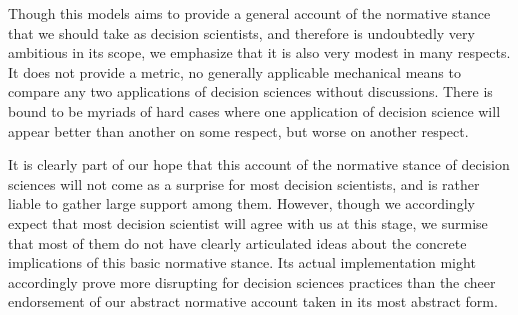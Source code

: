 \documentclass[preprint, french, english, 11pt, authoryear]{elsarticle}%
\newcommand{\commentOC}[1]{\textcolor{red}{OC: #1}}
\begin{document}
Though this models aims to provide a general account of the normative stance that we should take as decision scientists, and therefore is undoubtedly very ambitious in its scope, we emphasize that it is also very modest in many respects. It does not provide a metric, no generally applicable mechanical means to compare any two applications of decision sciences without discussions. There is bound to be myriads of hard cases where one application of decision science will appear better than another on some respect, but worse on another respect.

It is clearly part of our hope that this account of the normative stance of decision sciences will not come as a surprise for most decision scientists, and is rather liable to gather large support among them. However, though we accordingly expect that most decision scientist will agree with us at this stage, we surmise that most of them do not have clearly articulated ideas about the concrete implications of this basic normative stance. Its actual implementation might accordingly prove more disrupting for decision sciences practices than the cheer endorsement of our abstract normative account taken in its most abstract form.
 



\end{document}

